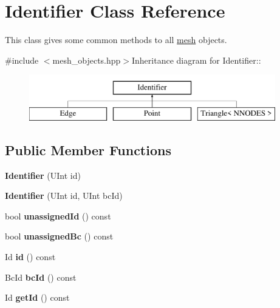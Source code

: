 \hypertarget{classIdentifier}{
\section{Identifier Class Reference}
\label{classIdentifier}
}


This class gives some common methods to all \hyperlink{structmesh}{mesh} objects.  


{\ttfamily \#include $<$mesh\_\-objects.hpp$>$}Inheritance diagram for Identifier::\begin{figure}[H]
\begin{center}
\leavevmode
\includegraphics[height=2cm]{classIdentifier}
\end{center}
\end{figure}
\subsection*{Public Member Functions}
\begin{DoxyCompactItemize}
\item 
\hypertarget{classIdentifier_a681904976f9d3c8b7ea728ad1ea7778e}{
{\bfseries Identifier} (UInt id)}
\label{classIdentifier_a681904976f9d3c8b7ea728ad1ea7778e}

\item 
\hypertarget{classIdentifier_a75ddf5e6a39bf767bb4b275af581b638}{
{\bfseries Identifier} (UInt id, UInt bcId)}
\label{classIdentifier_a75ddf5e6a39bf767bb4b275af581b638}

\item 
\hypertarget{classIdentifier_a58f26c5c63f5683e6bfe9aa1dce6cc5b}{
bool {\bfseries unassignedId} () const }
\label{classIdentifier_a58f26c5c63f5683e6bfe9aa1dce6cc5b}

\item 
\hypertarget{classIdentifier_affb22acd31bc98b94246cac539654682}{
bool {\bfseries unassignedBc} () const }
\label{classIdentifier_affb22acd31bc98b94246cac539654682}

\item 
\hypertarget{classIdentifier_a2ab7d66987f46ab6bbbd78c7ea11e000}{
Id {\bfseries id} () const }
\label{classIdentifier_a2ab7d66987f46ab6bbbd78c7ea11e000}

\item 
\hypertarget{classIdentifier_acc353bc402ec82e6e507b0b3e447c938}{
BcId {\bfseries bcId} () const }
\label{classIdentifier_acc353bc402ec82e6e507b0b3e447c938}

\item 
\hypertarget{classIdentifier_a287f4ccdfdaac69cd5c7f6c68be5c6b1}{
Id {\bfseries getId} () const }
\label{classIdentifier_a287f4ccdfdaac69cd5c7f6c68be5c6b1}

\end{DoxyCompactItemize}
